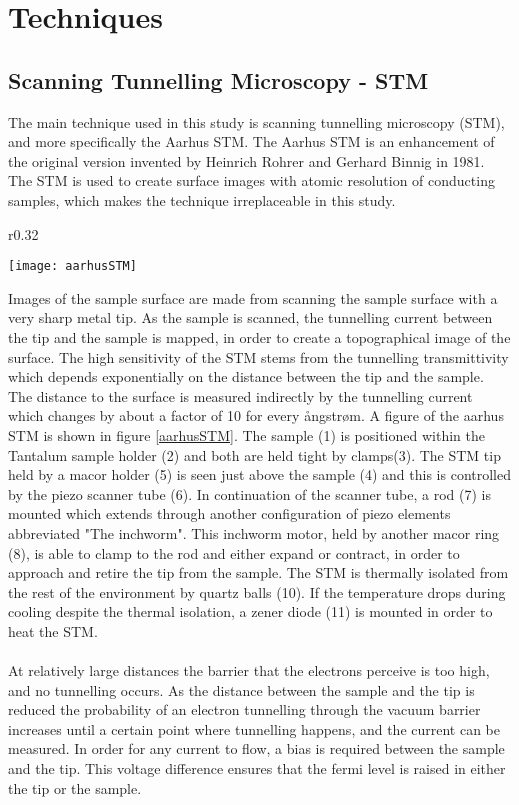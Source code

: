 \chapter{Techniques}

\section{Scanning Tunnelling Microscopy - STM}

The main technique used in this study is scanning tunnelling microscopy (STM), and more specifically the Aarhus STM. The Aarhus STM is an enhancement of the original version invented by Heinrich Rohrer and Gerhard Binnig in 1981.\cite{aarhusSTM} The STM is used to create surface images with atomic resolution of conducting samples, which makes the technique irreplaceable in this study.\\
\begin{wrapfigure}{r}{0.32\textwidth}
  \begin{center}
    \texttt{[image: aarhusSTM]}
  \end{center}
  \caption{Schematic of the aarhus STM. \cite{aarhusSTM}}
  \label{aarhusSTM}
\end{wrapfigure}
Images of the sample surface are made from scanning the sample surface with a very sharp metal tip. As the sample is scanned, the tunnelling current between the tip and the sample is mapped, in order to create a topographical image of the surface. The high sensitivity of the STM stems from the tunnelling transmittivity which depends exponentially on the distance between the tip and the sample. The distance to the surface is measured indirectly by the tunnelling current which changes by about a factor of 10 for every ångstrøm.\cite{STMbinnig} A figure of the aarhus STM is shown in figure \ref{aarhusSTM}. The sample (1) is positioned within the Tantalum sample holder (2) and both are held tight by clamps(3). The STM tip held by a macor holder (5) is seen just above the sample (4) and this is controlled by the piezo scanner tube (6). In continuation of the scanner tube, a rod (7) is mounted which extends through another configuration of piezo elements abbreviated "The inchworm". This inchworm motor, held by another macor ring (8), is able to clamp to the rod and either expand or contract, in order to approach and retire the tip from the sample. The STM is thermally isolated from the rest of the environment by quartz balls (10). If the temperature drops during cooling despite the thermal isolation,  a zener diode (11) is mounted in order to heat the STM.\\
\\
At relatively large distances the barrier that the electrons perceive is too high, and no tunnelling occurs. As the distance between the sample and the tip is reduced the probability of an electron tunnelling through the vacuum barrier increases until a certain point where tunnelling happens, and the current can be measured. In order for any current to flow, a bias is required between the sample and the tip. This voltage difference ensures that the fermi level is raised in either the tip or the sample.


